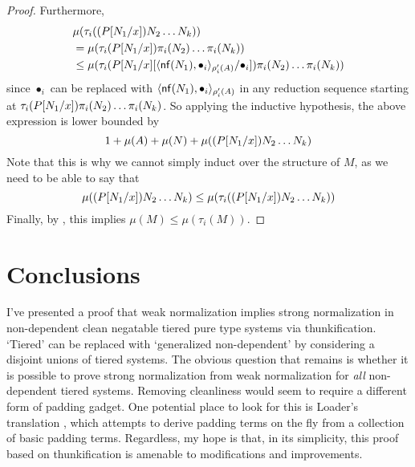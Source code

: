 \documentclass{article}
\begin{document}
\begin{proof}
Furthermore,
\begin{align*}
    & \mu(\tau_i((\sub P {N_1} x)N_2 \dots N_k)) \\ &=
     \mu(\tau_i(\sub P {N_1} x) \pi_i(N_2) \dots \pi_i(N_k)) \\ &\leq    
    \mu(\sub{\tau_i(\sub P {N_1} x} {\pair[\rho_i'(A)] {\mathsf{nf}(N_1)} {\bullet_i}} {\bullet_i}) \pi_i(N_2) \dots \pi_i(N_k))
\end{align*}
since $\bullet_i$ can be replaced with $\pair[\rho_i'(A)] {\mathsf{nf}(N_1)} {\bullet_i}$ in any reduction sequence starting at $\tau_i(\sub P {N_1} x) \pi_i(N_2) \dots \pi_i(N_k)$.
So applying the inductive hypothesis, the above expression is lower bounded by
\[
    1 + \mu(A) + \mu(N) + \mu((\sub P {N_1} x)N_2 \dots N_k)
\]
Note that this is why we cannot simply induct over the structure of $M$, as we need to be able to say that
\[
    \mu((\sub P {N_1} x)N_2 \dots N_k) \leq \mu(\tau_i((\sub P {N_1} x)N_2 \dots N_k))
\]
Finally, by , this implies $\mu(M) \leq \mu(\tau_i(M))$.
\end{proof}

\section{Conclusions}

I've presented a proof that weak normalization implies strong normalization in non-dependent clean negatable tiered pure type systems via thunkification.
`Tiered' can be replaced with `generalized non-dependent' by considering a disjoint unions of tiered systems.
The obvious question that remains is whether it is possible to prove strong normalization from weak normalization for \textit{all} non-dependent tiered systems.
Removing cleanliness would seem to require a different form of padding gadget.
One potential place to look for this is Loader's translation \cite{loader-1995}, which attempts to derive padding terms on the fly from a collection of basic padding terms.
Regardless, my hope is that, in its simplicity, this proof based on thunkification is amenable to modifications and improvements.



\end{document}
